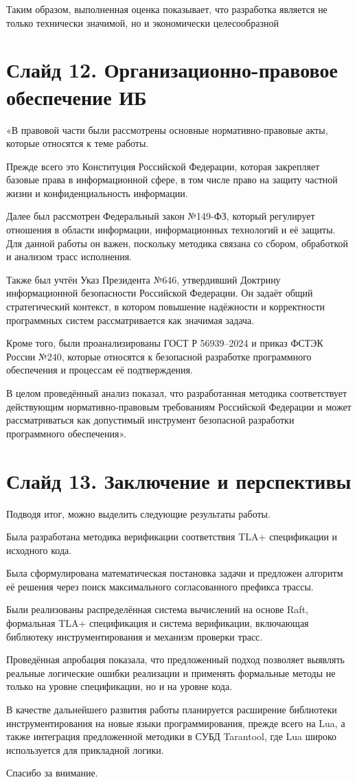 \documentclass[12pt,a4paper]{article}
\begin{document}
Таким образом, выполненная оценка показывает, что разработка является
не только технически значимой, но и экономически целесообразной

\section*{Слайд 12. Организационно-правовое обеспечение ИБ}

«В правовой части были рассмотрены основные нормативно-правовые акты,
которые относятся к теме работы.

Прежде всего это Конституция Российской Федерации, которая закрепляет
базовые права в информационной сфере, в том числе право на защиту
частной жизни и конфиденциальность информации.

Далее был рассмотрен Федеральный закон №149-ФЗ, который регулирует
отношения в области информации, информационных технологий и её защиты.
Для данной работы он важен, поскольку методика связана со сбором,
обработкой и анализом трасс исполнения.

Также был учтён Указ Президента №646, утвердивший Доктрину
информационной безопасности Российской Федерации. Он задаёт общий
стратегический контекст, в котором повышение надёжности и корректности
программных систем рассматривается как значимая задача.

Кроме того, были проанализированы ГОСТ Р 56939–2024 и приказ ФСТЭК
России №240, которые относятся к безопасной разработке программного
обеспечения и процессам её подтверждения.

В целом проведённый анализ показал, что разработанная методика
соответствует действующим нормативно-правовым требованиям Российской
Федерации и может рассматриваться как допустимый инструмент безопасной
разработки программного обеспечения».

\section*{Слайд 13. Заключение и перспективы}

Подводя итог, можно выделить следующие результаты работы.

Была разработана методика верификации соответствия TLA+ спецификации и
исходного кода.

Была сформулирована математическая постановка задачи и предложен
алгоритм её решения через поиск максимального согласованного
префикса трассы.

Были реализованы распределённая система вычислений на основе Raft,
формальная TLA+ спецификация и система верификации, включающая
библиотеку инструментирования и механизм проверки трасс.

Проведённая апробация показала, что предложенный подход позволяет
выявлять реальные логические ошибки реализации и применять формальные
методы не только на уровне спецификации, но и на уровне кода.

В качестве дальнейшего развития работы планируется расширение
библиотеки инструментирования на новые языки программирования,
прежде всего на Lua, а также интеграция предложенной методики в
СУБД Tarantool, где Lua широко используется для прикладной логики.

Спасибо за внимание.
\end{document}
